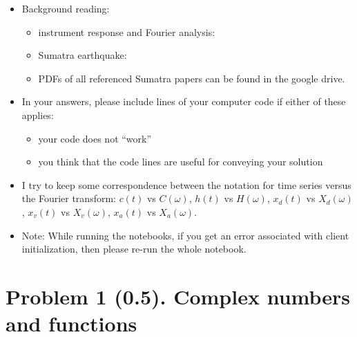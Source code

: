 \documentclass[11pt,titlepage,fleqn]{article}
\newcommand{\fft}{h}
\newcommand{\ffw}{H}
\begin{document}
\begin{itemize}

\item Background reading:

\begin{itemize}
\item instrument response and Fourier analysis: \citet[][Ch.~6]{SteinWysession}
\item Sumatra earthquake: \citep{Lay2005,Ammon2005,Park2005,Ni2005}
\item PDFs of all referenced Sumatra papers can be found in the google drive.
\end{itemize}

\item In your answers, please include lines of your computer code if either of these applies:
%
\begin{itemize}
\item your code does not ``work''
\item you think that the code lines are useful for conveying your solution
\end{itemize}

\item I try to keep some correspondence between the notation for time series versus the Fourier transform: $c(t)$ vs $C(\omega)$, $\fft(t)$ vs $\ffw(\omega)$, $x_d(t)$ vs $X_d(\omega)$, $x_v(t)$ vs $X_v(\omega)$, $x_a(t)$ vs $X_a(\omega)$.

\item Note: While running the notebooks, if you get an error associated with client initialization, then please re-run the whole notebook.

\end{itemize}


\section*{Problem 1 (0.5). Complex numbers and functions}
\end{document}
